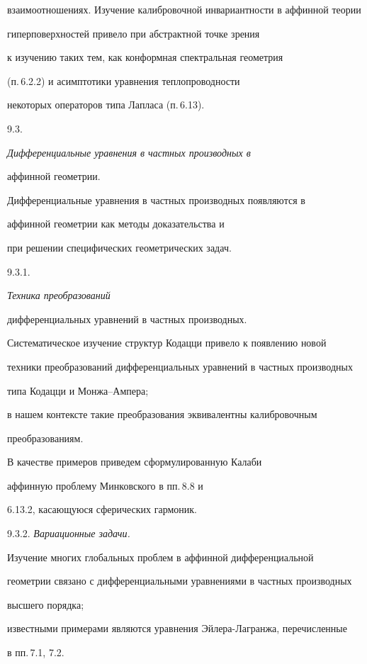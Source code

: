 взаимоотношениях. Изучение калибровочной инвариантности в аффинной теории

гиперповерхностей привело при абстрактной точке зрения

к изучению таких тем, как конформная спектральная геометрия

(п.\,6.2.2) и асимптотики уравнения теплопроводности

некоторых операторов типа Лапласа (п.\,6.13).

\medskip



9.3. {\it Дифференциальные уравнения в частных производных в

аффинной геометрии.}

Дифференциальные уравнения в частных производных появляются в

аффинной геометрии как методы доказательства и

при решении специфических геометрических задач.

\smallskip



9.3.1. {\it Техника преобразований

дифференциальных уравнений в частных производных.}

Систематическое изучение структур Кодацци привело к появлению новой

техники преобразований дифференциальных уравнений в частных производных

типа Кодацци и Монжа--Ампера;

в нашем контексте такие преобразования эквивалентны калибровочным

преобразованиям.

В качестве примеров приведем сформулированную Калаби

аффинную проблему Минковского в пп.\,8.8 и

6.13.2, касающуюся сферических гармоник.

\smallskip



9.3.2. {\it Вариационные задачи.}

Изучение многих глобальных проблем в аффинной дифференциальной

геометрии связано с дифференциальными уравнениями в частных производных

высшего порядка;

известными примерами являются уравнения Эйлера-Лагранжа, перечисленные

в пп.\,7.1, 7.2.

